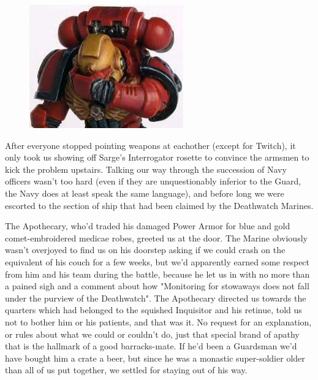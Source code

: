 \begin{figure}
	\begin{center}
		\includegraphics[width=\figwidth]{pics/17/24.png}
	\end{center}
\end{figure}
After everyone stopped pointing weapons at eachother (except for Twitch), it only took us showing off Sarge's Interrogator rosette to convince the armsmen to kick the problem upstairs. 
Talking our way through the succession of Navy officers wasn't too hard (even if they are unquestionably inferior to the Guard, the Navy does at least speak the same language), and before long we were escorted to the section of ship that had been claimed by the Deathwatch Marines.

The Apothecary, who'd traded his damaged Power Armor for blue and gold comet-embroidered medicae robes, greeted us at the door. 
The Marine obviously wasn't overjoyed to find us on his doorstep asking if we could crash on the equivalent of his couch for a few weeks, but we'd apparently earned some respect from him and his team during the battle, because he let us in with no more than a pained sigh and a comment about how "Monitoring for stowaways does not fall under the purview of the Deathwatch". 
The Apothecary directed us towards the quarters which had belonged to the squished Inquisitor and his retinue, told us not to bother him or his patients, and that was it. 
No request for an explanation, or rules about what we could or couldn't do, just that special brand of apathy that is the hallmark of a good barracks-mate. 
If he'd been a Guardsman we'd have bought him a crate a beer, but since he was a monastic super-soldier older than all of us put together, we settled for staying out of his way.

